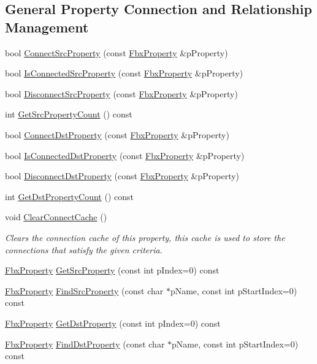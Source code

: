 \subsection*{General Property Connection and Relationship Management}
\begin{DoxyCompactItemize}
\item 
bool \hyperlink{class_fbx_property_aeeed658a70181e4bd6030c516065eb03}{Connect\+Src\+Property} (const \hyperlink{class_fbx_property}{Fbx\+Property} \&p\+Property)
\item 
bool \hyperlink{class_fbx_property_aca4ace4ad256046bc548c54173dab0c1}{Is\+Connected\+Src\+Property} (const \hyperlink{class_fbx_property}{Fbx\+Property} \&p\+Property)
\item 
bool \hyperlink{class_fbx_property_a25e6a00df6d1ec69db93a1d31c38374b}{Disconnect\+Src\+Property} (const \hyperlink{class_fbx_property}{Fbx\+Property} \&p\+Property)
\item 
int \hyperlink{class_fbx_property_a536aec7568f10441cf70045aa8842429}{Get\+Src\+Property\+Count} () const
\item 
bool \hyperlink{class_fbx_property_a1da4b660e1375970a8fa1dfb09074e3e}{Connect\+Dst\+Property} (const \hyperlink{class_fbx_property}{Fbx\+Property} \&p\+Property)
\item 
bool \hyperlink{class_fbx_property_aff04371bd84802d5c50c397e5716b604}{Is\+Connected\+Dst\+Property} (const \hyperlink{class_fbx_property}{Fbx\+Property} \&p\+Property)
\item 
bool \hyperlink{class_fbx_property_aa7178fdcef5b430fd74b5a1385b18ce7}{Disconnect\+Dst\+Property} (const \hyperlink{class_fbx_property}{Fbx\+Property} \&p\+Property)
\item 
int \hyperlink{class_fbx_property_abfcc52bdbd9853b10806740934b0230a}{Get\+Dst\+Property\+Count} () const
\item 
void \hyperlink{class_fbx_property_abc41950bc933e9bc5454e1b5b39c4d5c}{Clear\+Connect\+Cache} ()
\begin{DoxyCompactList}\small\item\em Clears the connection cache of this property, this cache is used to store the connections that satisfy the given criteria. \end{DoxyCompactList}\item 
\hyperlink{class_fbx_property}{Fbx\+Property} \hyperlink{class_fbx_property_ad538b18849614ac8d6ec3031bdf8a7ea}{Get\+Src\+Property} (const int p\+Index=0) const
\item 
\hyperlink{class_fbx_property}{Fbx\+Property} \hyperlink{class_fbx_property_ae3efe1d4750e6e4e5b0a91cde0adb935}{Find\+Src\+Property} (const char $\ast$p\+Name, const int p\+Start\+Index=0) const
\item 
\hyperlink{class_fbx_property}{Fbx\+Property} \hyperlink{class_fbx_property_ade7a6b86edce76764b6b4cb4854cb9b7}{Get\+Dst\+Property} (const int p\+Index=0) const
\item 
\hyperlink{class_fbx_property}{Fbx\+Property} \hyperlink{class_fbx_property_ac4658f970d7c354229e1f6fe71d0d250}{Find\+Dst\+Property} (const char $\ast$p\+Name, const int p\+Start\+Index=0) const
\end{DoxyCompactItemize}


